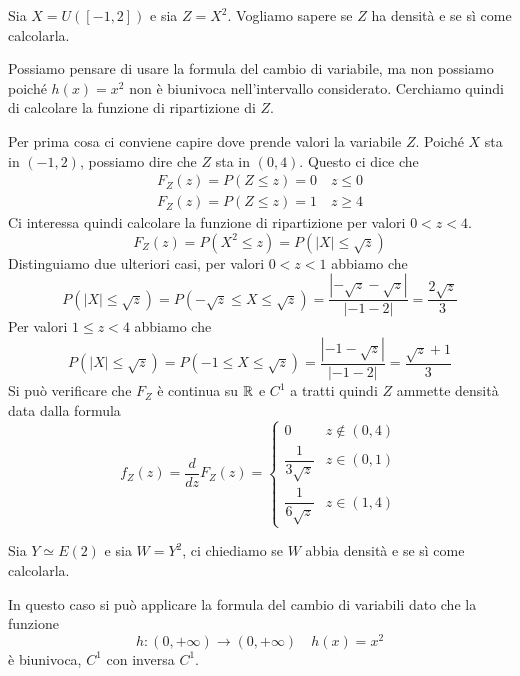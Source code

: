 \begin{example}
	Sia $X = U([-1, 2])$ e sia $Z = X^2$. Vogliamo sapere se $Z$ ha densità e se sì come calcolarla.

	Possiamo pensare di usare la formula del cambio di variabile, ma non possiamo poiché
	$h(x) = x^2$ non è biunivoca nell'intervallo considerato. Cerchiamo quindi di calcolare la
	funzione di ripartizione di $Z$.

	Per prima cosa ci conviene capire dove prende valori la variabile $Z$. Poiché $X$ sta in
	$(-1, 2)$, possiamo dire che $Z$ sta in $(0,4)$. Questo ci dice che
	\begin{gather*}
		F_Z(z) = P(Z \leq z) = 0 \quad z \leq 0 \\
		F_Z(z) = P(Z \leq z) = 1 \quad z \geq 4
	\end{gather*}
	Ci interessa quindi calcolare la funzione di ripartizione per valori $0 < z < 4$.
	\[ F_Z(z) = P(X^2 \leq z) = P(|X| \leq \sqrt{z}) \]
	Distinguiamo due ulteriori casi, per valori $0 < z < 1$ abbiamo che
	\[
		P(|X| \leq \sqrt{z}) = P(-\sqrt{z} \leq X \leq \sqrt{z}) =
		\frac{|-\sqrt{z} - \sqrt{z}|}{|-1 - 2|} = \frac{2 \sqrt{z}}{3}
	\]
	Per valori $1 \leq z < 4$ abbiamo che
	\[
		P(|X| \leq \sqrt{z}) = P(-1 \leq X \leq \sqrt{z}) =
		\frac{|-1 - \sqrt{z}|}{|-1 - 2|} = \frac{\sqrt{z} + 1}{3}
	\]
	Si può verificare che $F_Z$ è continua su $\mathbb{R}$ e $C^1$ a tratti quindi $Z$ ammette densità data
	dalla formula
	\[
		f_Z (z) = \frac{d}{dz} F_Z(z) = \begin{cases}
			0                     & z \notin (0,4) \\[2ex]
			\dfrac{1}{3 \sqrt{z}} & z \in (0,1)    \\[2ex]
			\dfrac{1}{6 \sqrt{z}} & z \in (1, 4)
		\end{cases}
	\]
\end{example}

\begin{example}
	Sia $Y \simeq E(2)$ e sia $W = Y^2$, ci chiediamo se $W$ abbia densità e se sì come calcolarla.

	In questo caso si può applicare la formula del cambio di variabili dato che la funzione
	\[ h : (0, +\infty) \to (0, +\infty) \quad h(x) = x^2 \]
	è biunivoca, $C^1$ con inversa $C^1$.
\end{example}

